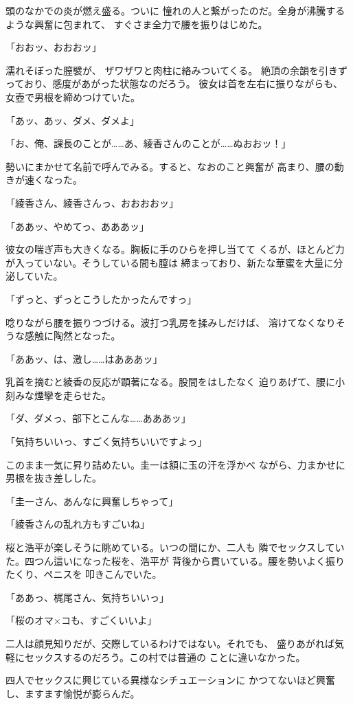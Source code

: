 ﻿\documentclass[
    book,tate,
    line_length=30zw,
    jafontsize=12pt,
    paper=b5j,
    landscape,
    ]{jlreq}
\begin{document}
頭のなかでの炎が燃え盛る。ついに
憧れの人と繋がったのだ。全身が沸騰するような興奮に包まれて、
すぐさま全力で腰を振りはじめた。

「おおッ、おおおッ」

濡れそぼった膣襞が、 ザワザワと肉柱に絡みついてくる。
絶頂の余韻を引きずっており、感度があがった状態なのだろう。
彼女は首を左右に振りながらも、女壺で男根を締めつけていた。

「あッ、あッ、ダメ、ダメよ」

「お、俺、課長のことが……あ、綾香さんのことが……ぬおおッ！」

勢いにまかせて名前で呼んでみる。すると、なおのこと興奮が
高まり、腰の動きが速くなった。

「綾香さん、綾香さんっ、おおおおッ」

「ああッ、やめてっ、あああッ」

彼女の喘ぎ声も大きくなる。胸板に手のひらを押し当てて
くるが、ほとんど力が入っていない。そうしている間も膣は
締まっており、新たな華蜜を大量に分泌していた。

「ずっと、ずっとこうしたかったんですっ」

唸りながら腰を振りつづける。波打つ乳房を揉みしだけば、
溶けてなくなりそうな感触に陶然となった。

「ああッ、は、激し……はあああッ」

乳首を摘むと綾香の反応が顕著になる。股間をはしたなく
迫りあげて、腰に小刻みな煙攣を走らせた。

「ダ、ダメっ、部下とこんな……あああッ」

「気持ちいいっ、すごく気持ちいいですよっ」

このまま一気に昇り詰めたい。圭一は額に玉の汗を浮かべ
ながら、力まかせに男根を抜き差しした。

「圭一さん、あんなに興奮しちゃって」

「綾香さんの乱れ方もすごいね」

桜と浩平が楽しそうに眺めている。いつの間にか、二人も
隣でセックスしていた。四つん這いになった桜を、浩平が
背後から貫いている。腰を勢いよく振りたくり、ペニスを
叩きこんでいた。

「ああっ、梶尾さん、気持ちいいっ」

「桜のオマ×コも、すごくいいよ」

二人は顔見知りだが、交際しているわけではない。それでも、
盛りあがれば気軽にセックスするのだろう。この村では普通の
ことに違いなかった。

四人でセックスに興じている異様なシチュエーションに
かつてないほど興奮し、ますます愉悦が膨らんだ。
\end{document}

